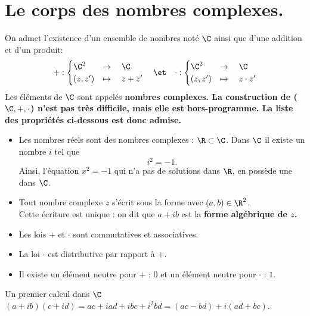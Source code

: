 \documentclass[11pt]{article}
\begin{document}


\thispagestyle{fancy}

\section{Le corps des nombres complexes.}

On admet l'existence d'un ensemble de nombres noté $\C$ ainsi que d'une addition et d'un produit:
\begin{equation*}
    +:\begin{cases}
        \C^2&\to\quad\C\\
        (z,z')&\mapsto\quad z+z'
    \end{cases}\quad\et\quad\cdot:\begin{cases}
        \C^2&\to\quad\C\\
        (z,z')&\mapsto\quad z\cdot z'
    \end{cases}
\end{equation*}
Les éléments de $\C$ sont appelés \bf{nombres complexes}. La construction de ($\C,+,\cdot$) n'est pas très difficile, mais elle est hors-programme. La liste des propriétés ci-dessous est donc admise.
\begin{itemize}
    \item Les nombres réels sont des nombres complexes : $\R \subset \C$. Dans $\C$ il existe un nombre $i$ tel que
    \begin{equation*}
        i^2=-1.
    \end{equation*}
    Ainsi, l'équation $x^2=-1$ qui n'a pas de solutions dans $\R$, en possède une dans $\C$.
    \item Tout nombre complexe $z$ s'écrit sous la forme  avec $(a,b)\in\R^2$.\\
    Cette écriture est unique : on dit que $a+ib$ est la \bf{forme algébrique} de $z$.
    \item Les lois $+$ et $\cdot$ sont commutatives et associatives.
    \item La loi $\cdot$ est distributive par rapport à $+$.
    \item Il existe un élément neutre pour $+$ : $0$ et un élément neutre pour $\cdot$ : $1$.
\end{itemize}

\begin{meth}{Un premier calcul dans $\C$}{}
    $(a+ib)(c+id)=ac + iad + ibc + i^2bd = (ac - bd) + i(ad + bc)$.
\end{meth}
\end{document}

